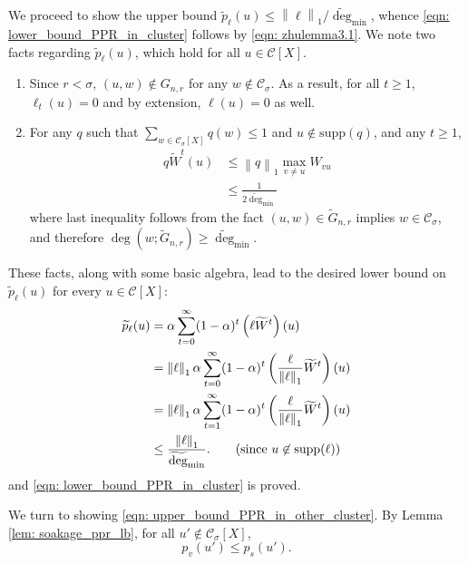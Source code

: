 \documentclass[11pt,twoside]{article}
\newcommand{\norm}[1]{\left\lVert#1\right\rVert}
\newcommand{\1}{\mathbf{1}}
\newcommand{\pbf}{p}        %
\newcommand{\Xbf}{X}             %
\newcommand{\Wbf}{W}
\newcommand{\Cset}{\mathcal{C}}
\newcommand{\Csig}{\Cset_{\sigma}}
\newcommand{\degminwt}{\widetilde{\deg}_{\min}}
\begin{document}
	We proceed to show the upper bound $\widetilde{\pbf}_{\ell}(u) \leq \norm{\ell}_1 / \degminwt$, whence \eqref{eqn: lower_bound_PPR_in_cluster} follows by \eqref{eqn: zhulemma3.1}. We note two facts regarding $\widetilde{\pbf}_{\ell}(u)$, which hold for all $u \in \Cset[\Xbf]$. 
	\begin{enumerate}
		\item Since $r < \sigma$, $(u,w) \not\in G_{n,r}$ for any $w \not\in \Csig$. As a result, for all $t \geq 1$, $\ell_t(u) = 0$ and by extension, $\ell(u) = 0$ as well.
		\item For any $q$ such that $\sum_{w \in \Csig[\Xbf]} q(w) \leq 1$ and $u \not\in \mathrm{supp}(q)$, and any $t \geq 1$,
		\begin{align}
		\label{eqn: one_step_bound}
		q \widetilde{\Wbf}^t (u) & \leq \norm{q}_1 \max_{v \neq u} W_{vu} \nonumber \\
		& \leq \frac{1}{2\degminwt} 
		\end{align}
		where last inequality follows from the fact $(u,w) \in \widetilde{G}_{n,r}$ implies $w \in \Csig$, and therefore $\deg(w; \widetilde{G}_{n,r}) \geq \degminwt$.
	\end{enumerate}
	
	These facts, along with some basic algebra, lead to the desired lower bound on $\widetilde{\pbf}_{\ell}(u)$ for every $u \in \Cset[\Xbf]$:
	\begin{align*}
	\widetilde{\pbf}_{\ell}(u) & = \alpha \sum_{t = 0}^{\infty} (1 - \alpha)^t \left(\ell \widetilde{\Wbf}^t \right)(u)  \nonumber \\
	& = \norm{\ell}_1 \alpha \sum_{t = 0}^{\infty} (1 - \alpha)^t \left(\frac{\ell}{\norm{\ell}_1}  \widetilde{\Wbf}^t \right)(u)\nonumber \\
	& = \norm{\ell}_1 \alpha \sum_{t = 1}^{\infty} (1 - \alpha)^t \left(\frac{\ell}{\norm{\ell}_1}  \widetilde{\Wbf}^t \right)(u)\nonumber \\
	& \leq \frac{\norm{\ell}_1 }{\degminwt}. \tag{since $u \not\in \mathrm{supp}(\ell)$}
	\end{align*}
	and \eqref{eqn: lower_bound_PPR_in_cluster} is proved.
	
	We turn to showing \eqref{eqn: upper_bound_PPR_in_other_cluster}. By Lemma \ref{lem: soakage_ppr_lb}, for all $u' \not\in \Csig[\Xbf]$,
	\begin{equation*}
	\pbf_v(u') \leq \pbf_s(u').
	\end{equation*}
	
\end{document}
